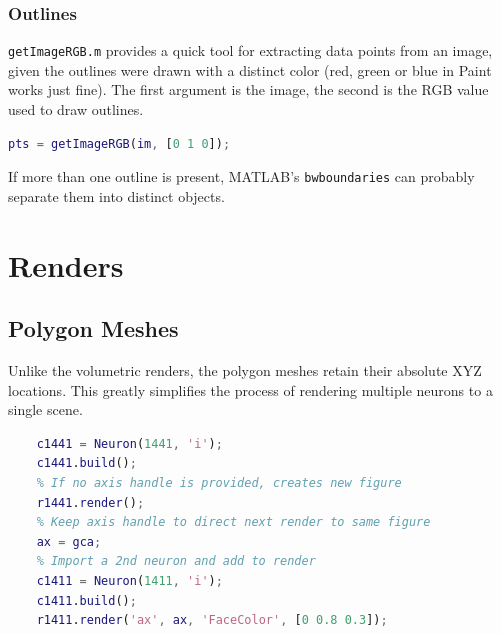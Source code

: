 \documentclass[12pt]{exam}
\begin{document}
	\subsubsection{Outlines}
	\texttt{getImageRGB.m} provides a quick tool for extracting data points from an image, given the outlines were drawn with a distinct color (red, green or blue in Paint works just fine). The first argument is the image, the second is the RGB value used to draw outlines.
	\begin{lstlisting}[language=matlab]
	pts = getImageRGB(im, [0 1 0]);\end{lstlisting}
	If more than one outline is present, MATLAB's \texttt{bwboundaries} can probably separate them into distinct objects.
	
	\section{Renders}
	\subsection{Polygon Meshes}

	Unlike the volumetric renders, the polygon meshes retain their absolute XYZ locations. This greatly simplifies the process of rendering multiple neurons to a single scene.
	\begin{lstlisting}[language=matlab]
	% Import a neuron and build the model
	c1441 = Neuron(1441, 'i');
	c1441.build();
	% If no axis handle is provided, creates new figure
	r1441.render();
	% Keep axis handle to direct next render to same figure
	ax = gca; 
	% Import a 2nd neuron and add to render
	c1411 = Neuron(1411, 'i');
	c1411.build();
	r1411.render('ax', ax, 'FaceColor', [0 0.8 0.3]);\end{lstlisting}
\end{document}
